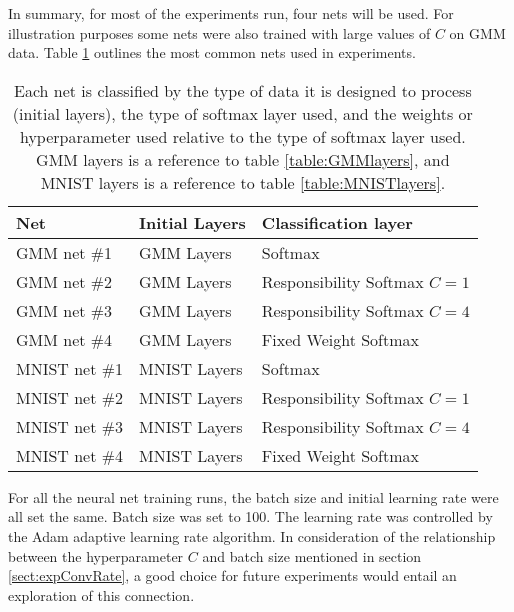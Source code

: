 In summary, for most of the experiments run, four nets will be used. For illustration purposes some nets were also trained with large values of \( C \) on GMM data. Table \ref{table:neuralnetconfig} outlines the most common nets used in experiments.

\begin{table}[h]
	\centering
	\begin{tabular}{|m{}|m{}|m{}|}
		\toprule
		\textbf{Net}  & \textbf{Initial Layers}& \textbf{Classification layer}\\ \midrule
		GMM net \#1     & GMM Layers   & Softmax     \\ \midrule
		GMM net \#2     & GMM Layers   & Responsibility Softmax \( C=1 \) \\ \midrule
		GMM net \#3     & GMM Layers   & Responsibility Softmax \( C=4 \) \\ \midrule
		GMM net \#4     & GMM Layers   & Fixed Weight Softmax \\ \midrule
		MNIST net \#1   & MNIST Layers & Softmax     \\ \midrule
		MNIST net \#2   & MNIST Layers & Responsibility Softmax \( C=1 \) \\ \midrule
		MNIST net \#3   & MNIST Layers & Responsibility Softmax \( C=4 \) \\ \midrule
		MNIST net \#4   & MNIST Layers & Fixed Weight Softmax \\ 
		\bottomrule
	\end{tabular}	
	\caption[A table of neural net setups used in numerical experiments]{Each net is classified by the type of data it is designed to process (initial layers), the type of softmax layer used, and the weights or hyperparameter used relative to the type of softmax layer used. GMM layers is a reference to table \ref{table:GMMlayers}, and MNIST layers is a reference to table \ref{table:MNISTlayers}. }\label{table:neuralnetconfig}
\end{table}

For all the neural net training runs, the batch size and initial learning rate were all set the same. Batch size was set to 100.  The learning rate was controlled by the Adam adaptive learning rate algorithm.  In consideration of the relationship between the hyperparameter \( C \) and batch size mentioned in section \ref{sect:expConvRate}, a good choice for future experiments would entail an exploration of this connection.
\FloatBarrier